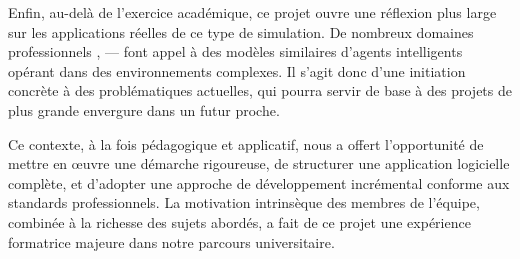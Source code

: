 Enfin, au-delà de l’exercice académique, ce projet ouvre une réflexion plus large sur les applications réelles de ce type de simulation. De nombreux domaines professionnels , — font appel à des modèles similaires d’agents intelligents opérant dans des environnements complexes. Il s’agit donc d’une initiation concrète à des problématiques actuelles, qui pourra servir de base à des projets de plus grande envergure dans un futur proche.

Ce contexte, à la fois pédagogique et applicatif, nous a offert l’opportunité de mettre en œuvre une démarche rigoureuse, de structurer une application logicielle complète, et d’adopter une approche de développement incrémental conforme aux standards professionnels. La motivation intrinsèque des membres de l’équipe, combinée à la richesse des sujets abordés, a fait de ce projet une expérience formatrice majeure dans notre parcours universitaire.